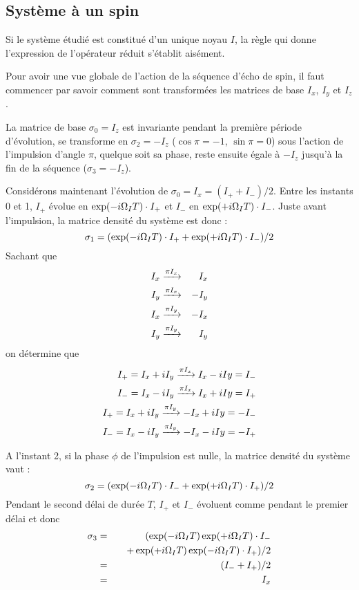 \subsection{Système à un spin}
\label{sec:echo1spin}
Si le système étudié est constitué d'un unique noyau $I$,
la règle qui donne l'expression de l'opérateur réduit s'établit aisément.

Pour avoir une vue globale de l'action de la séquence d'écho de spin, il faut
commencer par savoir comment sont transformées les matrices de base $I_x$, $I_y$ et $I_z$.

La matrice de base $\sigma_0 = I_z$ est invariante pendant la première période d'évolution, se 
transforme en $\sigma_2 = -I_z$ ($\cos\pi = -1$, $\sin\pi = 0$) 
sous l'action de l'impulsion d'angle $\pi$, quelque soit sa phase, 
reste ensuite égale à $-I_z$ jusqu'à la fin de la séquence ($\sigma_3 = -I_z$).

Considérons maintenant l'évolution de $\sigma_0 = I_x = (I_+ + I_-)/2$. 
Entre les instants 0 et 1, $I_+$ évolue en $\exp(-i\Omega_I T) \cdot I_+$
et $I_-$ en $\exp(+i\Omega_I T) \cdot I_-$.
Juste avant l'impulsion, la matrice densité du système est 
donc :
\begin{equation}
\sigma_1 = (\exp(-i\Omega_I T) \cdot I_+ + \exp(+i\Omega_I T) \cdot I_-)/2
\end{equation}
Sachant que 
\begin{eqnarray}
I_x & \xrightarrow{\pi I_x} & I_x \\
I_y & \xrightarrow{\pi I_x} & -I_y \\
I_x & \xrightarrow{\pi I_y} & -I_x \\
I_y & \xrightarrow{\pi I_y} & I_y
\end{eqnarray}
on détermine que
\begin{eqnarray}
I_+ = I_x + iI_y \xrightarrow{\pi I_x} I_x - iIy = I_- \\
I_- = I_x - iI_y \xrightarrow{\pi I_x} I_x + iIy = I_+ \\
I_+ = I_x + iI_y \xrightarrow{\pi I_y} -I_x + iIy = -I_- \\
I_- = I_x - iI_y \xrightarrow{\pi I_y} -I_x - iIy = -I_+
\end{eqnarray}

A l'instant 2, si la phase $\phi$ de l'impulsion est nulle, 
la matrice densité du système vaut :
\begin{equation}
\sigma_2 = (\exp(-i\Omega_I T) \cdot I_- + \exp(+i\Omega_I T) \cdot I_+)/2
\end{equation}
Pendant le second délai de durée $T$, $I_+$ et $I_-$ évoluent 
comme pendant le premier délai et donc
\begin{eqnarray}
\sigma_3 & = & (\exp(-i\Omega_I T)\exp(+i\Omega_I T) \cdot I_- \nonumber\\
& & \quad + \exp(+i\Omega_I T)\exp(-i\Omega_I T) \cdot I_+)/2 \\
& = & (I_- + I_+)/2 \\
& = & I_x
\end{eqnarray}

